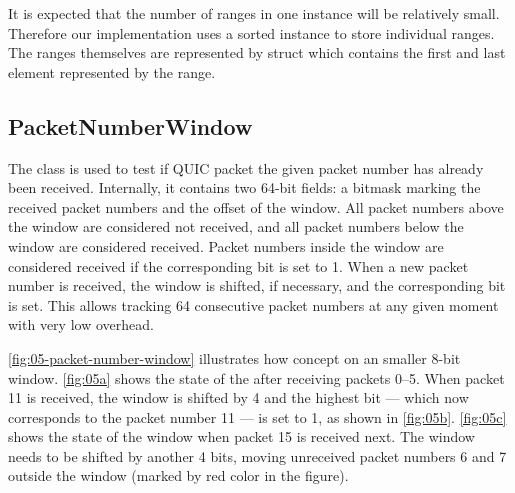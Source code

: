 It is expected that the number of ranges in one \RangeSet{} instance will be relatively small.
Therefore our implementation uses a sorted  instance to store individual ranges.
The ranges themselves are represented by  struct which contains
the first and last element represented by the range.

\subsection{PacketNumberWindow}

The \PacketNumberWindow{} class is used to test if QUIC packet the given packet number has already
been received. Internally, it contains two 64-bit  fields: a bitmask marking the
received packet numbers and the offset of the window. All packet numbers above the window are
considered not received, and all packet numbers below the window are considered received. Packet
numbers inside the window are considered received if the corresponding bit is set to 1. When a new
packet number is received, the window is shifted, if necessary, and the corresponding bit is set.
This allows tracking 64 consecutive packet numbers at any given moment with very low overhead.

\autoref{fig:05-packet-number-window} illustrates how concept on an smaller 8-bit window.
\autoref{fig:05a} shows the state of the \PacketNumberWindow{} after receiving packets 0--5. When
packet 11 is received, the window is shifted by 4 and the highest bit --- which now corresponds to
the packet number 11 --- is set to 1, as shown in \autoref{fig:05b}. \autoref{fig:05c} shows the
state of the window when packet 15 is received next. The window needs to be shifted by another 4
bits, moving unreceived packet numbers 6 and 7 outside the window (marked by red color in the
figure).

\newlength{\origframesep}
\setlength{\fboxsep}{0.12em}

